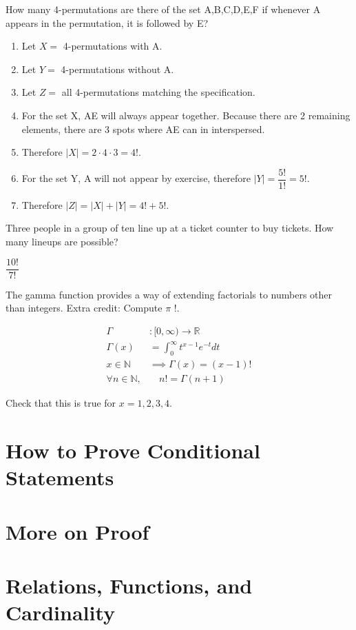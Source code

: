 \documentclass[openany, 11pt]{book}
\begin{document}
\begin{exercise}{}{}
	How many 4-permutations are there of the set A,B,C,D,E,F
	if whenever A appears in the permutation, it is followed by E?
	\begin{enumerate}[label={\textbullet}, leftmargin=*, itemsep=0pt, parsep=0pt]
		\item Let $X=$ 4-permutations with A.
		\item Let $Y=$ 4-permutations without A.
		\item Let $Z=$ all 4-permutations matching the specification.
		\item For the set X, AE will always appear together. Because there are 2
		      remaining elements, there are 3 spots where AE can in interspersed.
		\item Therefore $|X| = 2 \cdot 4\cdot3 = 4!.$
		\item For the set Y, A will not appear by exercise, therefore $|Y| =
			      \dfrac{5!}{1!} = 5!$.
		\item Therefore $|Z| = |X| + |Y| = 4! + 5!$. \square
	\end{enumerate}
\end{exercise}

\begin{exercise}{}{}
	Three people in a group of ten line up at a ticket counter to buy tickets.
	How many lineups are possible?

	$\dfrac{10!}{7!}$
\end{exercise}

\begin{exercise}{}{}
	The gamma function provides a way of extending factorials to numbers
	other than integers. Extra credit: Compute $\pi$ !.

	\begin{align*}
		\Gamma                    & :[0, \infty) \rightarrow \mathbb{R} \\
		\Gamma(x)                 & =\int_0^{\infty} t^{x-1} e^{-t} d t \\
		x \in \mathbb{N}          & \implies \Gamma(x)=(x-1)!           \\
		\forall n \in \mathbb{N}, & \quad n !=\Gamma(n+1)
	\end{align*}

	Check that this is true for $x=1,2,3,4$.
\end{exercise}

\part{How to Prove Conditional Statements}
\part{More on Proof}
\part{Relations, Functions, and Cardinality}
\end{document}
